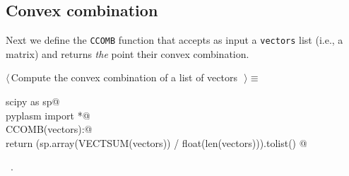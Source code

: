 \documentclass[11pt,oneside]{article}	%
\begin{document}
\subsection{Convex combination}
Next we define the \texttt{CCOMB} function that accepts as input a \texttt{vectors} list (i.e., a matrix) and returns \emph{the} point their convex combination.
\begin{flushleft} \small
\begin{minipage}{\linewidth} \label{scrap4}
$\langle\,$Compute the convex combination of a list of vectors\nobreak\ {\footnotesize {}}$\,\rangle\equiv$
\vspace{-1ex}
\begin{list}{}{} \item
\mbox{}\verb@import scipy as sp@\\
\mbox{}\verb@from pyplasm import *@\\
\mbox{}\verb@def CCOMB(vectors):@\\
\mbox{}\verb@    return (sp.array(VECTSUM(vectors)) / float(len(vectors))).tolist()  @\\
\mbox{}\verb@@{\NWsep}
\end{list}
\vspace{-1ex}
\footnotesize\addtolength{\baselineskip}{-1ex}
\begin{list}{}{\setlength{\itemsep}{-\parsep}\setlength{\itemindent}{-\leftmargin}}
\item \NWtxtMacroRefIn\ .
\end{list}
\end{minipage}\\[4ex]
\end{flushleft}
\end{document}

